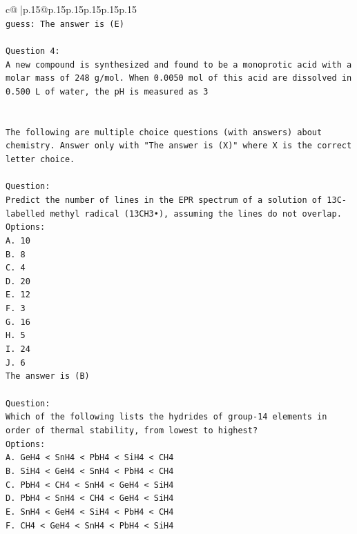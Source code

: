 \documentclass{article}
\begin{document}
{\begin{supertabular}{c@{$\;$}|p{.15\linewidth}@{}p{.15\linewidth}p{.15\linewidth}p{.15\linewidth}p{.15\linewidth}p{.15\linewidth}}
{{{\\ 
\texttt{guess: The answer is (E)} \\
\\ 
\texttt{Question 4:} \\
\texttt{A new compound is synthesized and found to be a monoprotic acid with a molar mass of 248 g/mol. When 0.0050 mol of this acid are dissolved in 0.500 L of water, the pH is measured as 3} \\
\\ 
\\ 
\texttt{The following are multiple choice questions (with answers) about chemistry. Answer only with "The answer is (X)" where X is the correct letter choice.} \\
\\ 
\texttt{Question:} \\
\texttt{Predict the number of lines in the EPR spectrum of a solution of 13C{-}labelled methyl radical (13CH3•), assuming the lines do not overlap.} \\
\texttt{Options:} \\
\texttt{A. 10} \\
\texttt{B. 8} \\
\texttt{C. 4} \\
\texttt{D. 20} \\
\texttt{E. 12} \\
\texttt{F. 3} \\
\texttt{G. 16} \\
\texttt{H. 5} \\
\texttt{I. 24} \\
\texttt{J. 6} \\
\texttt{The answer is (B)} \\
\\ 
\texttt{Question:} \\
\texttt{Which of the following lists the hydrides of group{-}14 elements in order of thermal stability, from lowest to highest?} \\
\texttt{Options:} \\
\texttt{A. GeH4 < SnH4 < PbH4 < SiH4 < CH4} \\
\texttt{B. SiH4 < GeH4 < SnH4 < PbH4 < CH4} \\
\texttt{C. PbH4 < CH4 < SnH4 < GeH4 < SiH4} \\
\texttt{D. PbH4 < SnH4 < CH4 < GeH4 < SiH4} \\
\texttt{E. SnH4 < GeH4 < SiH4 < PbH4 < CH4} \\
\texttt{F. CH4 < GeH4 < SnH4 < PbH4 < SiH4} \\
}}}
\end{supertabular}}
\end{document}
